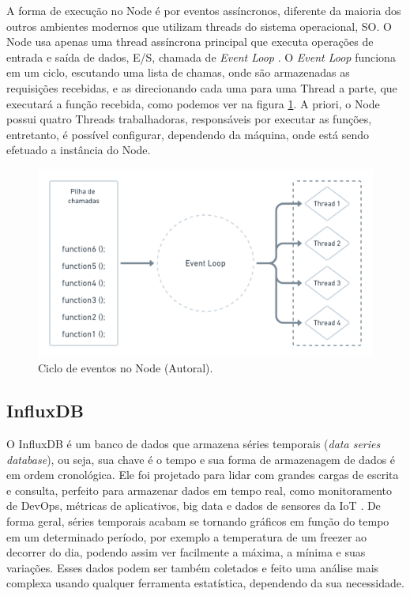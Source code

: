 A forma de execução no Node é por eventos assíncronos, diferente da maioria dos outros ambientes modernos que utilizam threads do sistema operacional, SO. O Node usa apenas uma thread assíncrona principal que executa operações de entrada e saída de dados, E/S, chamada de \textit{Event Loop} \cite{nodejsAbout}. O \textit{Event Loop} funciona em um ciclo, escutando uma lista de chamas, onde são armazenadas as requisições recebidas, e as direcionando cada uma para uma Thread a parte, que executará a função recebida, como podemos ver na figura \ref{fig:event-loop-node}. A priori, o  Node possui quatro Threads trabalhadoras, responsáveis por executar as funções, entretanto, é possível configurar, dependendo da máquina, onde está sendo efetuado a instância do Node.

\begin{figure}[H]
  \centering
  \includegraphics[width=.80\textwidth]{assets/event-loop-node.png} 
  \caption{Ciclo de eventos no Node (Autoral).}
  \label{fig:event-loop-node} 
\end{figure}

\subsection{InfluxDB}
\label{fund:influxdb}
O InfluxDB é um banco de dados que armazena séries temporais (\textit{data series database}), ou seja, sua chave é o tempo e sua forma de armazenagem de dados é em ordem cronológica. Ele foi projetado para lidar com grandes cargas de escrita e consulta, perfeito para armazenar dados em tempo real, como monitoramento de DevOps, métricas de aplicativos, big data e dados de sensores da IoT \cite{giacobbe2018implementation}. De forma geral, séries temporais acabam se tornando gráficos em função do tempo em um determinado período, por exemplo a temperatura de um freezer ao decorrer do dia, podendo assim ver facilmente a máxima, a mínima e suas variações. Esses dados podem ser também coletados e feito uma análise mais complexa usando qualquer ferramenta estatística, dependendo da sua necessidade.

